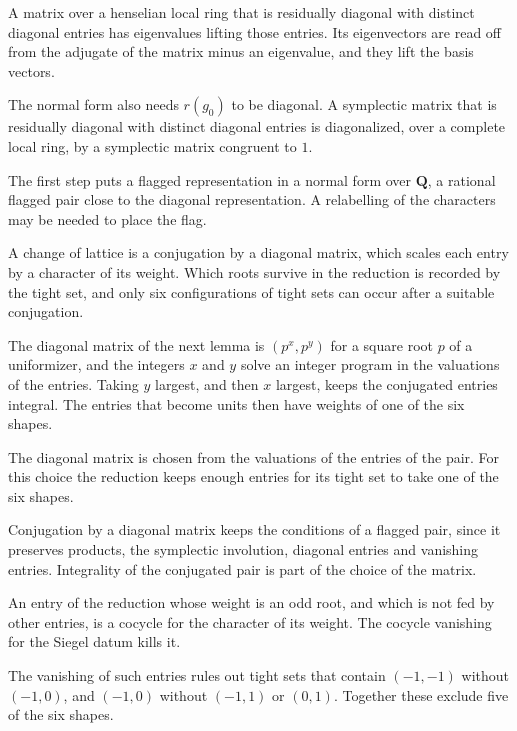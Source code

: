 A matrix over a henselian local ring that is residually diagonal with distinct diagonal entries has eigenvalues lifting those entries. Its eigenvectors are read off from the adjugate of the matrix minus an eigenvalue, and they lift the basis vectors.

The normal form also needs $r(g_0)$ to be diagonal. A symplectic matrix that is residually diagonal with distinct diagonal entries is diagonalized, over a complete local ring, by a symplectic matrix congruent to $1$.

The first step puts a flagged representation in a normal form over $\mathbf Q$, a rational flagged pair close to the diagonal representation. A relabelling of the characters may be needed to place the flag.

A change of lattice is a conjugation by a diagonal matrix, which scales each entry by a character of its weight. Which roots survive in the reduction is recorded by the tight set, and only six configurations of tight sets can occur after a suitable conjugation.

The diagonal matrix of the next lemma is $(p^x,p^y)$ for a square root $p$ of a uniformizer, and the integers $x$ and $y$ solve an integer program in the valuations of the entries. Taking $y$ largest, and then $x$ largest, keeps the conjugated entries integral. The entries that become units then have weights of one of the six shapes.

The diagonal matrix is chosen from the valuations of the entries of the pair. For this choice the reduction keeps enough entries for its tight set to take one of the six shapes.

Conjugation by a diagonal matrix keeps the conditions of a flagged pair, since it preserves products, the symplectic involution, diagonal entries and vanishing entries. Integrality of the conjugated pair is part of the choice of the matrix.

An entry of the reduction whose weight is an odd root, and which is not fed by other entries, is a cocycle for the character of its weight. The cocycle vanishing for the Siegel datum kills it.

The vanishing of such entries rules out tight sets that contain $(-1,-1)$ without $(-1,0)$, and $(-1,0)$ without $(-1,1)$ or $(0,1)$. Together these exclude five of the six shapes.

